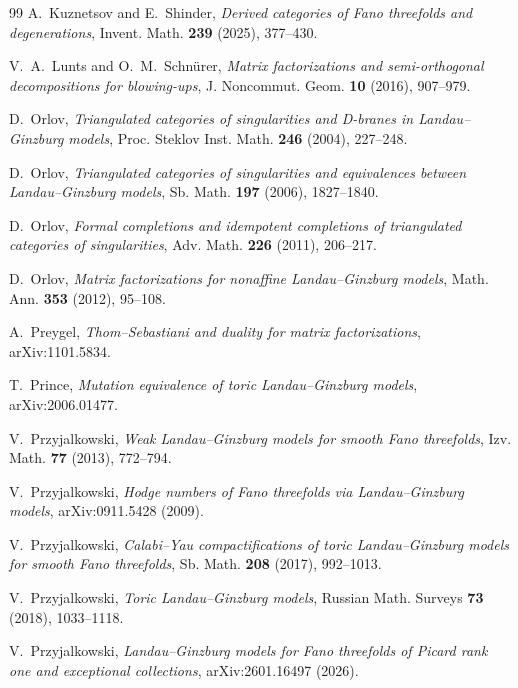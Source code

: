 \documentclass[11pt]{amsart}
\theoremstyle{definition}
\theoremstyle{remark}
\begin{document}
\begin{thebibliography}{99}
A.~Kuznetsov and E.~Shinder,
\emph{Derived categories of Fano threefolds and degenerations},
Invent. Math. \textbf{239} (2025), 377--430.

V.~A.~Lunts and O.~M.~Schn\"urer,
\emph{Matrix factorizations and semi-orthogonal decompositions for
blowing-ups},
J. Noncommut. Geom. \textbf{10} (2016), 907--979.

D.~Orlov,
\emph{Triangulated categories of singularities and D-branes in
Landau--Ginzburg models},
Proc. Steklov Inst. Math. \textbf{246} (2004), 227--248.

D.~Orlov,
\emph{Triangulated categories of singularities and equivalences between
Landau--Ginzburg models},
Sb. Math. \textbf{197} (2006), 1827--1840.

D.~Orlov,
\emph{Formal completions and idempotent completions of triangulated
categories of singularities},
Adv. Math. \textbf{226} (2011), 206--217.

D.~Orlov,
\emph{Matrix factorizations for nonaffine Landau--Ginzburg models},
Math. Ann. \textbf{353} (2012), 95--108.

A.~Preygel,
\emph{Thom--Sebastiani and duality for matrix factorizations},
arXiv:1101.5834.

T.~Prince,
\emph{Mutation equivalence of toric Landau--Ginzburg models},
arXiv:2006.01477.

V.~Przyjalkowski,
\emph{Weak Landau--Ginzburg models for smooth Fano threefolds},
Izv. Math. \textbf{77} (2013), 772--794.

V.~Przyjalkowski,
\emph{Hodge numbers of Fano threefolds via Landau--Ginzburg models},
arXiv:0911.5428 (2009).

V.~Przyjalkowski,
\emph{Calabi--Yau compactifications of toric Landau--Ginzburg models for
smooth Fano threefolds},
Sb. Math. \textbf{208} (2017), 992--1013.

V.~Przyjalkowski,
\emph{Toric Landau--Ginzburg models},
Russian Math. Surveys \textbf{73} (2018), 1033--1118.

V.~Przyjalkowski,
\emph{Landau--Ginzburg models for Fano threefolds of Picard rank one and
exceptional collections},
arXiv:2601.16497 (2026).

\end{thebibliography}
\end{document}
